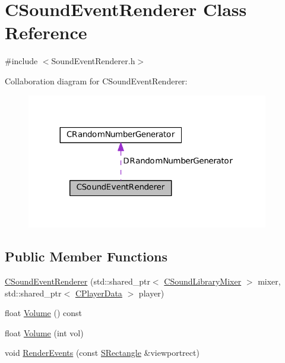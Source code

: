 \hypertarget{classCSoundEventRenderer}{}\section{C\+Sound\+Event\+Renderer Class Reference}
\label{classCSoundEventRenderer}


{\ttfamily \#include $<$Sound\+Event\+Renderer.\+h$>$}



Collaboration diagram for C\+Sound\+Event\+Renderer\+:\nopagebreak
\begin{figure}[H]
\begin{center}
\leavevmode
\includegraphics[width=299pt]{classCSoundEventRenderer__coll__graph}
\end{center}
\end{figure}
\subsection*{Public Member Functions}
\begin{DoxyCompactItemize}
\item 
\hyperlink{classCSoundEventRenderer_a2a1c105a120bebf386b772a06c2a053a}{C\+Sound\+Event\+Renderer} (std\+::shared\+\_\+ptr$<$ \hyperlink{classCSoundLibraryMixer}{C\+Sound\+Library\+Mixer} $>$ mixer, std\+::shared\+\_\+ptr$<$ \hyperlink{classCPlayerData}{C\+Player\+Data} $>$ player)
\item 
float \hyperlink{classCSoundEventRenderer_a96b3c1c479057daa5f62b73bab6409a3}{Volume} () const
\item 
float \hyperlink{classCSoundEventRenderer_a7266c3416291f3802d6f3476a29285a2}{Volume} (int vol)
\item 
void \hyperlink{classCSoundEventRenderer_aa8b0c3029ea920ae4f4a08b9d9dd1c9c}{Render\+Events} (const \hyperlink{structSRectangle}{S\+Rectangle} \&viewportrect)
\end{DoxyCompactItemize}
